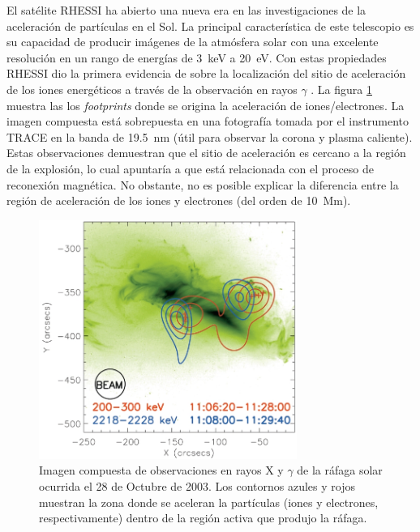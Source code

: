 El satélite RHESSI ha abierto una nueva era en las investigaciones de la aceleración de partículas en el Sol. La principal característica de este telescopio es su capacidad de producir imágenes de la atmósfera solar con una excelente resolución en un rango de energías de \SI{3}{\kilo\electronvolt} a \SI{20}{\electronvolt}. Con estas propiedades RHESSI dio la primera evidencia de sobre la localización del sitio de aceleración de los iones energéticos a través de la observación en rayos $\gamma$ \cite{hurford03,hurford06}. La figura \ref{fig:flare-foot} muestra las los \emph{footprints} donde se origina la aceleración de iones/electrones. La imagen compuesta está sobrepuesta en una fotografía tomada por el instrumento TRACE en la banda de \SI{19.5}{\nano\metre} (útil para observar la corona y plasma caliente). Estas observaciones demuestran que el sitio de aceleración es cercano a la región de la explosión, lo cual apuntaría a que está relacionada con el proceso de reconexión magnética. No obstante, no es posible explicar la diferencia entre la región de aceleración de los iones y electrones (del orden de \SI{10}{\mega\metre}).

\begin{figure}
        \centering
        \includegraphics[width=0.75\textwidth]{flare-footprints}
        \caption{Imagen compuesta de observaciones en rayos X y $\gamma$ de la ráfaga solar ocurrida el \num{28} de Octubre de \num{2003}. Los contornos azules y rojos muestran la zona donde se aceleran la partículas (iones y electrones, respectivamente) dentro de la región activa que produjo la ráfaga.}
        \label{fig:flare-foot}
\end{figure}

